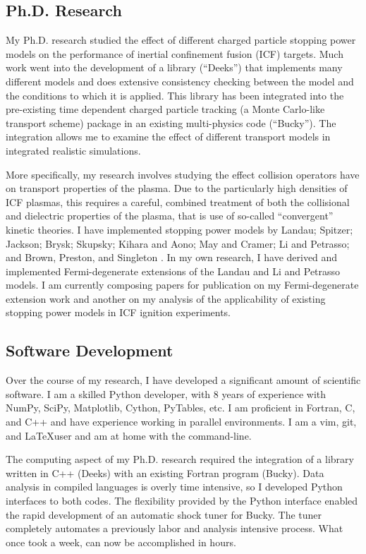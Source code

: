 \documentclass[letterpaper,11pt]{article}
\begin{document}
\subsection*{Ph.D. Research}
My Ph.D. research studied the effect of different charged particle stopping
power models on the performance of inertial confinement fusion (ICF) targets.
Much work went into the development of a library (``Deeks'') that implements
many different models and does extensive consistency checking between the model
and the conditions to which it is applied.  This library has been integrated
into the pre-existing time dependent charged particle tracking (a Monte
Carlo-like transport scheme) package in an existing multi-physics code
(``Bucky'').  The integration allows me to examine the effect of different
transport models in integrated realistic simulations.

\vspace{0.1in}

More specifically, my research involves studying the effect collision operators have on transport properties of the plasma.  Due to the particularly high densities of ICF plasmas, this requires a careful, combined treatment of both the collisional and dielectric properties of the plasma, that is use of so-called ``convergent'' kinetic theories.  I have implemented stopping power models by 
Landau; 
Spitzer; 
Jackson; 
Brysk; 
Skupsky; 
Kihara and Aono; 
May and Cramer; 
Li and Petrasso; 
and 
Brown, Preston, and Singleton%
.
In my own research, I have derived and implemented Fermi-degenerate extensions of the Landau and Li and Petrasso models.  I am currently composing papers for publication on my Fermi-degenerate extension work and another on my analysis of the applicability of existing stopping power models in ICF ignition experiments.  


\subsection*{Software Development}
Over the course of my research, I have developed a significant amount of
scientific software.  I am a skilled Python developer, with 8 years of
experience with NumPy, SciPy, Matplotlib, Cython, PyTables, etc.  I am
proficient in Fortran, C, and C++ and have experience working in parallel
environments.  I am a vim, git, and \LaTeX user and am at home with the
command-line.

The computing aspect of my Ph.D. research required the integration of a library
written in C++ (Deeks) with an existing Fortran program (Bucky).  Data analysis
in compiled languages is overly time intensive, so I developed Python
interfaces to both codes.  The flexibility provided by the Python interface
enabled the rapid development of an automatic shock tuner for Bucky.  The tuner
completely automates a previously labor and analysis intensive process.  What
once took a week, can now be accomplished in hours.
\end{document}
